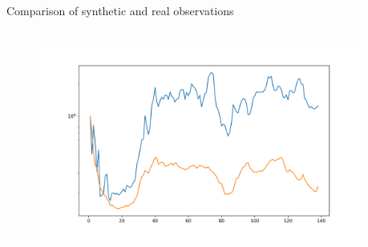 \documentclass[10pt,aspectratio=169,usenames,dvipsnames]{beamer}
\begin{document}
\begin{frame}{Comparison of synthetic and real observations}
\begin{columns}
\begin{column}{0.8\textwidth}
\begin{figure}
\includegraphics[width=0.95\linewidth]{2023Dundee/Figures/KHIrl2D_thinintens_mir.png}
\end{figure}
\end{column}
\begin{column}{0.2\textwidth}
\end{column}
\end{columns}
\end{frame}
\end{document}
